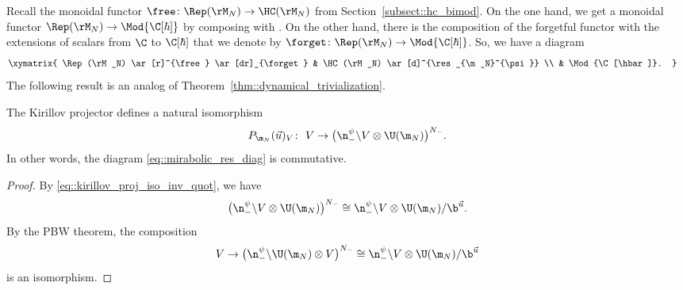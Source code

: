 	Recall the monoidal functor $\free \colon \Rep(\rM_N) \rightarrow \HC(\rM_N)$ from Section~\ref{subsect::hc_bimod}. On the one hand, we get a monoidal functor $\Rep(\rM_N) \rightarrow \Mod{\C[\hbar]}$ by composing with . On the other hand, there is the composition of the forgetful functor with the extensions of scalars from $\C$ to $\C[\hbar]$ that we denote by $\forget\colon \Rep(\rM_N) \rightarrow \Mod{\C[\hbar]}$. So, we have a diagram
	\begin{equation}
		\label{eq::mirabolic_res_diag}
\begin{split}
& \xymatrix{
			\Rep(\rM_N) \ar[r]^{\free} \ar[dr]_{\forget} & \HC(\rM_N) \ar[d]^{\res_{\m_N}^{\psi}} \\
			& \Mod{\C[\hbar]}.
		}
\end{split}
	\end{equation}
	The following result is an analog of Theorem~\ref{thm::dynamical_trivialization}.
	\begin{Theorem}
		\label{thm::mirabolic_kw_trivialization}
		The Kirillov projector defines a natural isomorphism
		\[
		P_{\m_N}(\vec{u})_V \colon\ V \rightarrow \bigl(\n_-^{\psi} \backslash V \otimes \U(\m_N)\bigr)^{N_-}.
		\]
		In other words, the diagram \eqref{eq::mirabolic_res_diag} is commutative.
		\begin{proof}
			By \eqref{eq::kirillov_proj_iso_inv_quot}, we have
			\[
			\bigl(\n_-^{\psi} \backslash V \otimes \U(\m_N)\bigr)^{N_-} \cong \n_-^{\psi} \backslash V \otimes \U(\m_N) / \b^{\vec{u}}.
			\]
			By the PBW theorem, the composition
			\[
			V \rightarrow \bigl(\n_-^{\psi} \backslash \U(\m_N) \otimes V\bigr)^{N_-} \cong \n_-^{\psi} \backslash V \otimes \U(\m_N) / \b^{\vec{u}}
			\]
			is an isomorphism.
		\end{proof}
	\end{Theorem}
	
